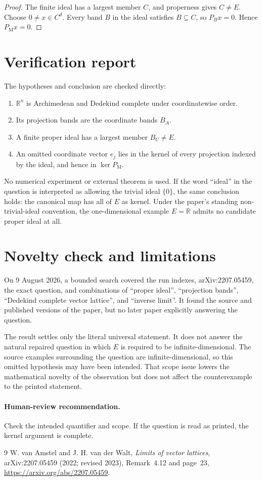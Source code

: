 \documentclass[11pt]{article}
\newcommand{\PM}{P_{\mathrm M}}
\begin{document}
\begin{proof}
The finite ideal has a largest member $C$, and properness gives $C\neq E$.
Choose $0\neq x\in C^d$.  Every band $B$ in the ideal satisfies $B\subseteq C$,
so $P_Bx=0$.  Hence $\PM x=0$.
\end{proof}

\section{Verification report}

The hypotheses and conclusion are checked directly:
\begin{enumerate}
\item $\mathbb R^n$ is Archimedean and Dedekind complete under coordinatewise
order.
\item Its projection bands are the coordinate bands $B_A$.
\item A finite proper ideal has a largest member $B_U\neq E$.
\item An omitted coordinate vector $e_j$ lies in the kernel of every projection
indexed by the ideal, and hence in $\ker\PM$.
\end{enumerate}
No numerical experiment or external theorem is used.  If the word ``ideal''
in the question is interpreted as allowing the trivial ideal $\{0\}$, the
same conclusion holds: the canonical map has all of $E$ as kernel.  Under the
paper's standing non-trivial-ideal convention, the one-dimensional example
$E=\mathbb R$ admits no candidate proper ideal at all.

\section{Novelty check and limitations}

On 9 August 2026, a bounded search covered the run indexes, arXiv:2207.05459,
the exact question, and combinations of ``proper ideal'', ``projection bands'',
``Dedekind complete vector lattice'', and ``inverse limit''.  It found the
source and published versions of the paper, but no later paper explicitly
answering the question.

The result settles only the literal universal statement.  It does not answer
the natural repaired question in which $E$ is required to be
infinite-dimensional.  The source examples surrounding the question are
infinite-dimensional, so this omitted hypothesis may have been intended.
That scope issue lowers the mathematical novelty of the observation but does
not affect the counterexample to the printed statement.

\paragraph{Human-review recommendation.}
Check the intended quantifier and scope.  If the question is read as printed,
the kernel argument is complete.

\begin{thebibliography}{9}
W. van Amstel and J. H. van der Walt,
\emph{Limits of vector lattices}, arXiv:2207.05459 (2022; revised 2023),
Remark~4.12 and page~23,
\url{https://arxiv.org/abs/2207.05459}.
\end{thebibliography}
\end{document}
